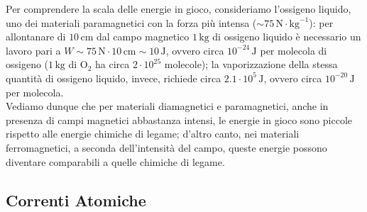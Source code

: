 \documentclass[]{article}
\begin{document}
%
Per comprendere la scala delle energie in gioco, consideriamo l'ossigeno liquido, uno dei materiali paramagnetici con la forza più intensa ($ \sim 75\,\text{N}\cdot\text{kg}^{-1} $): per allontanare di $ 10\,\text{cm} $ dal campo magnetico $ 1\,\text{kg} $ di ossigeno liquido è necessario un lavoro pari a $ W \sim 75 \,\text{N} \cdot 10\,\text{cm} \sim 10\,\text{J} $, ovvero circa $ 10^{-24}\,\text{J} $ per molecola di ossigeno ($ 1\,\text{kg} $ di $ \text{O}_2 $ ha circa $ 2\cdot 10^{25} $ molecole); la vaporizzazione della stessa quantità di ossigeno liquido, invece, richiede circa $ 2.1\cdot 10^5 \,\text{J} $, ovvero circa $ 10^{-20}\,\text{J} $ per molecola. \\ 
Vediamo dunque che per materiali diamagnetici e paramagnetici, anche in presenza di campi magnetici abbastanza intensi, le energie in gioco sono piccole rispetto alle energie chimiche di legame; d'altro canto, nei materiali ferromagnetici, a seconda dell'intensità del campo, queste energie possono diventare comparabili a quelle chimiche di legame.

\subsection{Correnti Atomiche}
\end{document}
